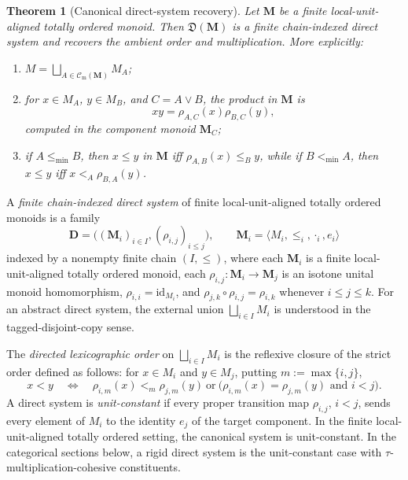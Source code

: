 \documentclass[pdflatex,sn-mathphys-num]{sn-jnl}
\theoremstyle{thmstyleone}%
\newtheorem{theorem}{Theorem}[section]
\theoremstyle{thmstyletwo}%
\theoremstyle{thmstylethree}%
\newcommand{\Cm}{\mathcal C_{\mathrm m}}
\begin{document}
\begin{theorem}[Canonical direct-system recovery]\label{thm:canonical-direct-system}
Let \(\mathbf M\) be a finite local-unit-aligned totally ordered monoid.
Then \(\mathfrak D(\mathbf M)\) is a finite chain-indexed direct system and recovers the ambient order and multiplication.
More explicitly:
\begin{enumerate}
\item\label{item:direct-disjoint-union} \(M=\bigsqcup_{A\in\Cm(\mathbf M)}M_A\);

\item\label{item:direct-product-recovery} for \(x\in M_A\), \(y\in M_B\), and \(C=A\vee B\), the product in \(\mathbf M\) is
\[
xy=\rho_{A,C}(x)\rho_{B,C}(y),
\]
computed in the component monoid \(\mathbf M_C\);

\item\label{item:direct-order-recovery} if \(A\le_{\min}B\), then \(x\le y\) in \(\mathbf M\) iff \(\rho_{A,B}(x)\le_B y\), while if \(B<_{\min}A\), then \(x\le y\) iff \(x<_A\rho_{B,A}(y)\).
\end{enumerate}
\end{theorem}

A \emph{finite chain-indexed direct system} of finite local-unit-aligned totally ordered monoids is a family
\[
\mathbf D=\bigl((\mathbf M_i)_{i\in I},(\rho_{i,j})_{i\le j}\bigr),
\qquad
\mathbf M_i=\langle M_i,\le_i,\cdot_i,e_i\rangle
\]
indexed by a nonempty finite chain \((I,\le)\), where each \(\mathbf M_i\) is a finite local-unit-aligned totally ordered monoid, each \(\rho_{i,j}\colon\mathbf M_i\to\mathbf M_j\) is an isotone unital monoid homomorphism, \(\rho_{i,i}=\mathrm{id}_{M_i}\), and \(\rho_{j,k}\circ\rho_{i,j}=\rho_{i,k}\) whenever \(i\le j\le k\).
For an abstract direct system, the external union \(\bigsqcup_{i\in I}M_i\) is understood in the tagged-disjoint-copy sense.

The \emph{directed lexicographic order} on \(\bigsqcup_{i\in I}M_i\) is the reflexive closure of the strict order defined as follows: for \(x\in M_i\) and \(y\in M_j\), putting \(m:=\max\{i,j\}\),
\[
x<y
\quad\Longleftrightarrow\quad
\rho_{i,m}(x)<_m\rho_{j,m}(y)
\ \text{or}\
\bigl(\rho_{i,m}(x)=\rho_{j,m}(y)\text{ and }i<j\bigr).
\]
A direct system is \emph{unit-constant} if every proper transition map \(\rho_{i,j}\), \(i<j\), sends every element of \(M_i\) to the identity \(e_j\) of the target component.
In the finite local-unit-aligned totally ordered setting, the canonical system is unit-constant.
In the categorical sections below, a rigid direct system is the unit-constant case with \(\tau\)-multiplication-cohesive constituents.
\end{document}
